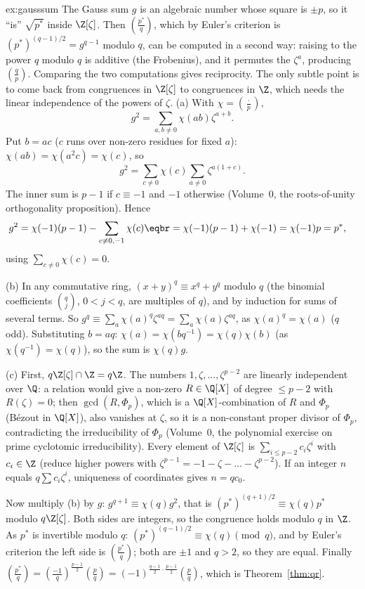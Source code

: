 \begin{solution}{ex:gausssum}
\idea The Gauss sum $g$ is an algebraic number whose square is $\pm p$, so it ``is'' $\sqrt{p^*}$ inside $\Z[\zeta]$. Then $\left(\frac{p^*}q\right)$, which by Euler's criterion is $(p^*)^{(q-1)/2}=g^{q-1}$ modulo $q$, can be computed in a second way: raising to the power $q$ modulo $q$ is additive (the Frobenius), and it permutes the $\zeta^a$, producing $\left(\frac qp\right)$. Comparing the two computations gives reciprocity. The only subtle point is to come back from congruences in $\Z[\zeta]$ to congruences in $\Z$, which needs the linear independence of the powers of $\zeta$.
\writeup (a) With $\chi=\left(\frac\cdot p\right)$,
\[
g^2=\sum_{a,b\ne0}\chi(ab)\zeta^{a+b}.
\] Put $b=ac$ ($c$ runs over non-zero residues for fixed $a$): $\chi(ab)=\chi(a^2c)=\chi(c)$, so
\[g^2=\sum_{c\ne0}\chi(c)\sum_{a\ne0}\zeta^{a(1+c)}.\]
The inner sum is $p-1$ if $c\equiv-1$ and $-1$ otherwise (Volume~0, the roots-of-unity orthogonality proposition). Hence
\[\begin{aligned}g^2&=\chi(-1)(p-1)-\sum_{c\ne0,-1}\chi(c)\eqbr=\chi(-1)(p-1)+\chi(-1)=\chi(-1)p=p^*,\end{aligned}\]
using $\sum_{c\ne0}\chi(c)=0$.

(b) In any commutative ring, $(x+y)^q\equiv x^q+y^q$ modulo $q$ (the binomial coefficients $\binom qj$, $0<j<q$, are multiples of $q$), and by induction for sums of several terms. So $g^q\equiv\sum_a\chi(a)^q\zeta^{aq}=\sum_a\chi(a)\zeta^{aq}$, as $\chi(a)^q=\chi(a)$ ($q$ odd). Substituting $b=aq$: $\chi(a)=\chi(bq^{-1})=\chi(q)\chi(b)$ (as $\chi(q^{-1})=\chi(q)$), so the sum is $\chi(q)g$.

(c) First, $q\Z[\zeta]\cap\Z=q\Z$. The numbers $1,\zeta,\dots,\zeta^{p-2}$ are linearly independent over $\Q$: a relation would give a non-zero $R\in\Q[X]$ of degree $\le p-2$ with $R(\zeta)=0$; then $\gcd(R,\Phi_p)$, which is a $\Q[X]$-combination of $R$ and $\Phi_p$ (B\'ezout in $\Q[X]$), also vanishes at $\zeta$, so it is a non-constant proper divisor of $\Phi_p$, contradicting the irreducibility of $\Phi_p$ (Volume~0, the polynomial exercise on prime cyclotomic irreducibility). Every element of $\Z[\zeta]$ is $\sum_{i\le p-2}c_i\zeta^i$ with $c_i\in\Z$ (reduce higher powers with $\zeta^{p-1}=-1-\zeta-\dots-\zeta^{p-2}$). If an integer $n$ equals $q\sum c_i\zeta^i$, uniqueness of coordinates gives $n=qc_0$.

Now multiply (b) by $g$: $g^{q+1}\equiv\chi(q)g^2$, that is $(p^*)^{(q+1)/2}\equiv\chi(q)p^*$ modulo $q\Z[\zeta]$. Both sides are integers, so the congruence holds modulo $q$ in $\Z$. As $p^*$ is invertible modulo $q$: $(p^*)^{(q-1)/2}\equiv\chi(q)\pmod q$, and by Euler's criterion the left side is $\left(\frac{p^*}q\right)$; both are $\pm1$ and $q>2$, so they are equal. Finally $\left(\frac{p^*}q\right)=\left(\frac{-1}q\right)^{\frac{p-1}2}\left(\frac pq\right)=(-1)^{\frac{q-1}2\cdot\frac{p-1}2}\left(\frac pq\right)$, which is Theorem~\ref{thm:qr}.


\end{solution}
